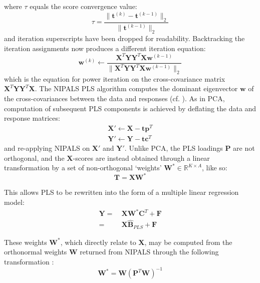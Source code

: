 \begin{doublespace}
where $\tau$ equals the score convergence value:
\begin{equation}
\tau = \frac{\| \mathbf{t}^{(k)} - \mathbf{t}^{(k-1)} \|_2}
            {\| \mathbf{t}^{(k-1)} \|_2}
\end{equation}
and iteration superscripts have been dropped for readability. Backtracking the
iteration assignments now produces a different iteration equation:
\begin{equation}
\mathbf{w}^{(k)} \gets \frac{
    \mathbf{X}^T \mathbf{Y} \mathbf{Y}^T \mathbf{X} \mathbf{w}^{(k-1)}
}{
 \| \mathbf{X}^T \mathbf{Y} \mathbf{Y}^T \mathbf{X} \mathbf{w}^{(k-1)} \|_2
}
\end{equation}
which is the equation for power iteration on the cross-covariance matrix
$\mathbf{X}^T \mathbf{Y} \mathbf{Y}^T \mathbf{X}$. The NIPALS PLS algorithm
computes the dominant eigenvector $\mathbf{w}$ of the cross-covariances between
the data and responses (cf. ). As in PCA,
computation of subsequent PLS components is achieved by deflating
the data and response matrices:
\begin{align}
\mathbf{X}' \gets \mathbf{X} - \mathbf{t} \mathbf{p}^T \\
\mathbf{Y}' \gets \mathbf{Y} - \mathbf{t} \mathbf{c}^T
\end{align}
and re-applying NIPALS on $\mathbf{X}'$ and $\mathbf{Y}'$. Unlike PCA, the PLS
loadings $\mathbf{P}$ are not orthogonal, and the $\mathbf{X}$-scores are
instead obtained through a linear transformation by a set of non-orthogonal
`weights' $\mathbf{W}^\ast \in \mathbb{R}^{K \times A}$, like so:
\begin{equation}
\mathbf{T} = \mathbf{X} \mathbf{W}^\ast
\end{equation}

This allows PLS to be rewritten into the form of a multiple linear regression
model:
\begin{align}
\mathbf{Y} =& \: \mathbf{X} \mathbf{W}^\ast \mathbf{C}^T + \mathbf{F} \\
           =& \: \mathbf{X} \hat{\mathbf{B}}_{PLS} + \mathbf{F} \nonumber
\end{align}

These weights $\mathbf{W}^\ast$, which directly relate to $\mathbf{X}$, may be
computed from the orthonormal weights $\mathbf{W}$ returned from NIPALS through
the following transformation \cite{manne:cils1987}:
\begin{equation}
\mathbf{W}^\ast = \mathbf{W} (\mathbf{P}^T \mathbf{W})^{-1}
\end{equation}
\end{doublespace}

